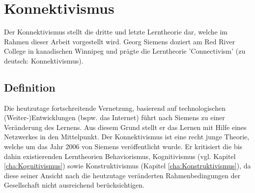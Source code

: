 \chapter{Konnektivismus}
\label{cha:Konnektivismus}
Der Konnektivismus stellt die dritte und letzte Lerntheorie dar, welche im Rahmen dieser Arbeit vorgestellt wird. Georg Siemens doziert am Red River College in kanadischen Winnipeg und prägte die Lerntheorie 'Connectivism' (zu deutsch: Konnektivismus).\cite[S. 159]{Erpenbeck.2007}

\section{Definition}\label{Konnektivismus Definition}
Die heutzutage fortschreitende Vernetzung, basierend auf technologischen (Weiter-)Entwicklungen (bspw. das Internet) führt nach Siemens zu einer Veränderung des Lernens. Aus diesem Grund stellt er das Lernen mit Hilfe eines Netzwerkes in den Mittelpunkt. Der Konnektivismus ist eine recht junge Theorie, welche um das Jahr 2006 von Siemens veröffentlicht wurde. Er kritisiert die bis dahin existierenden Lerntheorien Behaviorismus, Kognitivismus (vgl. Kapitel \ref{cha:Kognitivismus}) sowie Konstruktivismus (Kapitel \ref{cha:Konstruktivismus}), da diese seiner Ansicht nach die heutzutage veränderten Rahmenbedingungen der Gesellschaft nicht ausreichend berücksichtigen.\cite[S.47 f.]{Kuhlmann.2008} 


